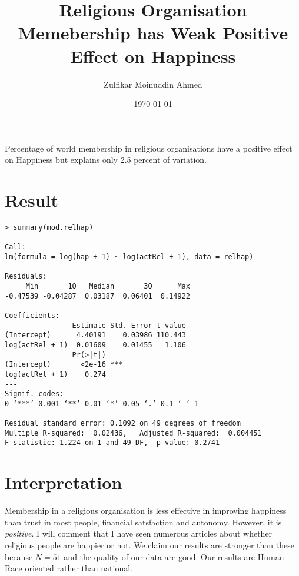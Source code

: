 \documentclass{amsart}
\title{Religious Organisation Memebership has Weak Positive Effect on Happiness}
\author{Zulfikar Moinuddin Ahmed}
\date{\today}
\begin{document}
\maketitle

Percentage of world membership in religious organisations have a positive effect on Happiness but explains only 2.5 percent of variation.

\section{Result}

\begin{verbatim}
> summary(mod.relhap)

Call:
lm(formula = log(hap + 1) ~ log(actRel + 1), data = relhap)

Residuals:
     Min       1Q   Median       3Q      Max 
-0.47539 -0.04287  0.03187  0.06401  0.14922 

Coefficients:
                Estimate Std. Error t value
(Intercept)      4.40191    0.03986 110.443
log(actRel + 1)  0.01609    0.01455   1.106
                Pr(>|t|)    
(Intercept)       <2e-16 ***
log(actRel + 1)    0.274    
---
Signif. codes:  
0 ‘***’ 0.001 ‘**’ 0.01 ‘*’ 0.05 ‘.’ 0.1 ‘ ’ 1

Residual standard error: 0.1092 on 49 degrees of freedom
Multiple R-squared:  0.02436,	Adjusted R-squared:  0.004451 
F-statistic: 1.224 on 1 and 49 DF,  p-value: 0.2741
\end{verbatim}


\section{Interpretation}

Membership in a religious organisation is less effective in improving happiness than trust in most people, financial satsfaction and autonomy.  However,  it is {\em positive}.  I will comment that I have seen numerous articles about whether religious people are happier or not.  We claim our results are stronger than these because $N=51$ and the quality of our data are good.  Our results are Human Race oriented rather than national.
\end{document}
